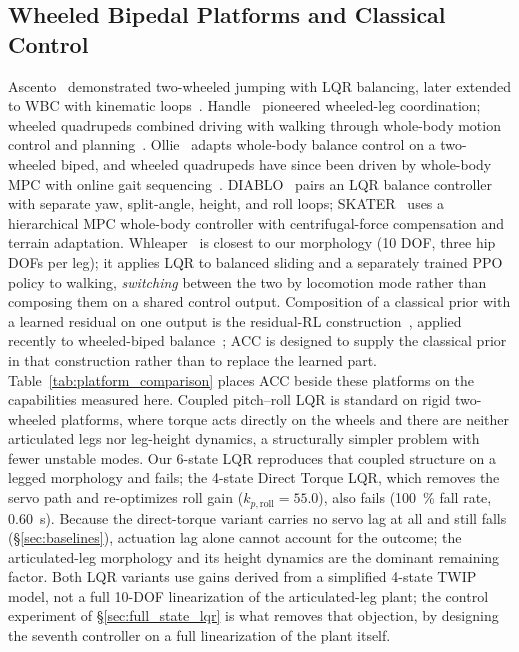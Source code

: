 \documentclass[conference]{IEEEtran}
\begin{document}
\subsection{Wheeled Bipedal Platforms and Classical Control}
\label{sec:related_pos}
Ascento~\cite{klemm2019ascento} demonstrated two-wheeled jumping with LQR balancing, later extended to WBC with kinematic loops~\cite{klemm2020lqrwbc}.
Handle~\cite{boston_dynamics_handle2017} pioneered wheeled-leg coordination; wheeled quadrupeds combined driving with walking through whole-body motion control and planning~\cite{bjelonic2019wheeled}.
Ollie~\cite{zhang2022ollie} adapts whole-body balance control on a two-wheeled biped, and wheeled quadrupeds have since been driven by whole-body MPC with online gait sequencing~\cite{bjelonic2021mpc}. DIABLO~\cite{diablo2024} pairs an LQR balance controller with separate yaw, split-angle, height, and roll loops; SKATER~\cite{skater2024} uses a hierarchical MPC whole-body controller with centrifugal-force compensation and terrain adaptation. Whleaper~\cite{whleaper2024} is closest to our morphology (10 DOF, three hip DOFs per leg); it applies LQR to balanced sliding and a separately trained PPO policy to walking, \emph{switching} between the two by locomotion mode rather than composing them on a shared control output. Composition of a classical prior with a learned residual on one output is the residual-RL construction~\cite{johannink2019residual,silver2018residual}, applied recently to wheeled-biped balance~\cite{zhang2025residualwbr}; ACC is designed to supply the classical prior in that construction rather than to replace the learned part. Table~\ref{tab:platform_comparison} places ACC beside these platforms on the capabilities measured here.
Coupled pitch--roll LQR is standard on rigid two-wheeled platforms, where torque acts directly on the wheels and there are neither articulated legs nor leg-height dynamics, a structurally simpler problem with fewer unstable modes. Our 6-state LQR reproduces that coupled structure on a legged morphology and fails; the 4-state Direct Torque LQR, which removes the servo path and re-optimizes roll gain ($k_{p,\text{roll}}{=}55.0$), also fails (\SI{100}{\percent} fall rate, \SI{0.60}{s}). Because the direct-torque variant carries no servo lag at all and still falls (\S\ref{sec:baselines}), actuation lag alone cannot account for the outcome; the articulated-leg morphology and its height dynamics are the dominant remaining factor. Both LQR variants use gains derived from a simplified 4-state TWIP model, not a full 10-DOF linearization of the articulated-leg plant; the control experiment of \S\ref{sec:full_state_lqr} is what removes that objection, by designing the seventh controller on a full linearization of the plant itself.
\end{document}
